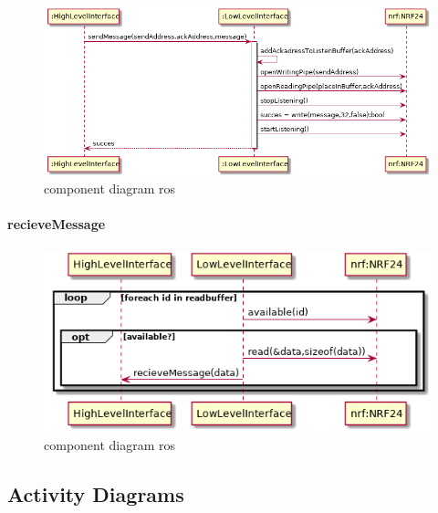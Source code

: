 \documentclass[a4paper, 11pt, oneside]{report}
\begin{document}
\begin{figure}[H]
	\begin{center}\includegraphics[width=1\linewidth]{UML/out/NRF24/sequence/lowlevelSendMessage/lowlevelSendMessage.png}\end{center}
	\caption{component diagram ros}
	\label{fig:NRF24:sequence:lowlevelSendMessage}
\end{figure}

\paragraph{recieveMessage}
\label{DetailedDesign:NRF24:sequence:recieveMessage}

\begin{figure}[H]
	\begin{center}\includegraphics[width=1\linewidth]{UML/out/NRF24/sequence/recieveMessage/recieveMessage.png}\end{center}
	\caption{component diagram ros}
	\label{fig:NRF24:sequence:recieveMessage}
\end{figure}


\subsection{Activity Diagrams}
\label{DetailedDesign:NRF24:activity}
\end{document}
